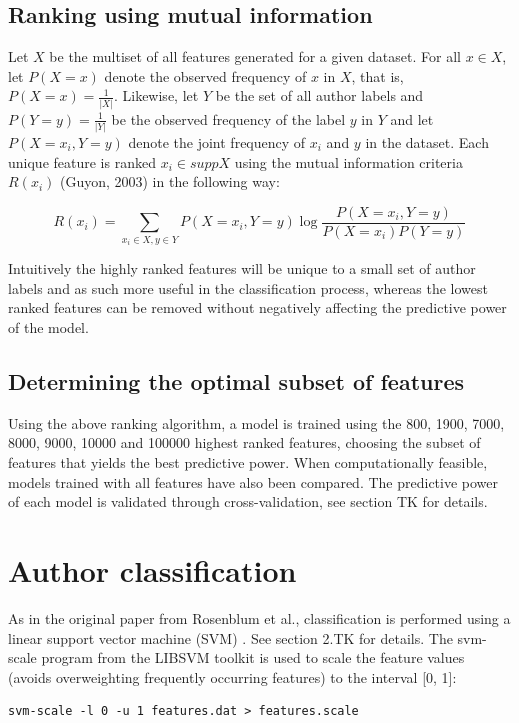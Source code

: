 \documentclass[a4paper,11pt]{kth-mag}
\begin{document}
\subsection{Ranking using mutual information}
Let $X$ be the multiset of all features generated for a given dataset. For all
$x \in X$, let $P(X = x)$ denote the observed frequency of $x$ in $X$, that is,
$P(X = x) = \frac{1}{|X|}$. Likewise, let $Y$ be the set of all author labels
and $P(Y = y)= \frac{1}{|Y|}$ be the observed frequency of the label $y$ in $Y$
and let $P(X=x_i,Y=y)$ denote the joint frequency of $x_i$ and $y$ in the dataset.
Each unique feature is ranked $x_i \in supp X $ using the mutual information
criteria $R(x_i)$ (Guyon, 2003) in the following way:

$$R(x_i)= \sum_{x_i \in X, y \in Y} P(X=x_i,Y=y) \log \frac{P(X = x_i,
Y = y)}{P(X = x_i)P(Y = y)}$$

Intuitively the highly ranked features will be unique to a small set of author
labels and as such more useful in the classification process, whereas the
lowest ranked features can be removed without negatively affecting the
predictive power of the model.
 
\subsection{Determining the optimal subset of features}
 
Using the above ranking algorithm, a model is trained using the 800, 1900, 7000,
8000, 9000, 10000 and 100000 highest ranked features, choosing the subset of
features that yields the best predictive power. When computationally feasible, models
trained with all features have also been compared.
The predictive power of each model is validated through cross-validation, see
section TK for details.

\section{Author classification}
As in the original paper from Rosenblum et al., classification is performed
using a linear support vector machine (SVM) \parencite{rosenblum2011wrote}. See
section 2.TK for details. The svm-scale program from the LIBSVM toolkit is used
\parencite{chang2011libsvm} to scale the feature values (avoids overweighting
frequently occurring features) to the interval [0, 1]:
\begin{lstlisting}
svm-scale -l 0 -u 1 features.dat > features.scale
\end{lstlisting}
\end{document}
